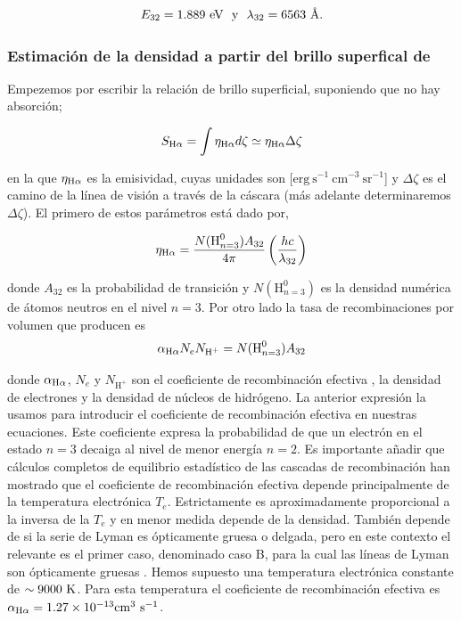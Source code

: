 \begin{equation}
 \label{eq:values-energy-landa}
  E_{32} = 1.889~\text{eV}  ~~ \text{y} ~~
  \lambda_{32} = 6563~\text{\AA{}}{}.
 \end{equation}

\subsubsection{Estimación de la densidad a partir del brillo superfical de \ha{} }
\label{sec:brillo}

Empezemos por escribir la relación de brillo superficial, suponiendo que no hay absorción;

\begin{equation}
  \label{eq:brillo}
  S_{\mathrm{H}\alpha{}} = \int \eta_{\mathrm{H}\alpha{}} d\zeta \simeq \eta_{\mathrm{H}\alpha{}} \Delta \zeta
\end{equation}  

\noindent en la que  \(\eta_{\mathrm{H}\alpha{}}\) es la emisividad, cuyas unidades son [\(\mathrm{erg~s^{-1}~cm^{-3}~sr^{-1}}\)] y \(\Delta \zeta\) es el camino de la línea de visión a través de la cáscara (más adelante determinaremos \(\Delta \zeta\)). El primero de estos parámetros está dado por,

  \begin{equation}
    \label{eq:emision-coeficiente}
    \eta_{\mathrm{H}\alpha} = \frac{N(\text{H}^0_{n=3})A_{32}}{4 \pi} \left(\frac{hc}{\lambda_{32}}\right) 
  \end{equation}

donde \(A_{32}\) es la probabilidad de transición y \(N(\text{H}^0_{n=3})\) es la densidad numérica de átomos neutros en el nivel \(n=3\). Por otro lado la tasa de recombinaciones por volumen que producen \ha{} es 
\begin{equation}
  \label{eq:recombinaciones}
  \alpha_{\mathrm{H}\alpha} N_{e}N_{\text{H}^{+}}=N(\text{H}^0_{n=3})A_{32}
\end{equation}

donde  \(\alpha_{\mathrm{H}\alpha}\), \(N_{e}\) y \(N_{\text{H}^{+}}\)  son el coeficiente de recombinación efectiva \citep{Osterbrock:2006}, la densidad de electrones y la densidad de núcleos de hidrógeno. La anterior expresión la usamos para introducir el coeficiente de recombinación efectiva en nuestras ecuaciones. Este coeficiente expresa la probabilidad de que un electrón en el estado \(n=3\) decaiga al nivel de menor energía \(n=2\). Es importante añadir que cálculos completos de equilibrio estadístico de las cascadas de recombinación han mostrado que el coeficiente de recombinación efectiva depende principalmente de la temperatura electrónica \(T_{e}\). Estrictamente es aproximadamente proporcional a la inversa de la  \(T_{e}\) \citep{Pequignot:1991, Nussbaumer:1984} y en menor medida depende de la densidad. También depende de si la serie de Lyman es ópticamente gruesa o delgada, pero en este contexto el relevante es el primer caso, denominado caso B, para la cual las líneas de Lyman son ópticamente gruesas \citep{Hummer:1987}. Hemos supuesto una temperatura electrónica constante de \(\sim 9000~\mathrm{K} \). Para esta temperatura el coeficiente de recombinación efectiva es \(\alpha_{\mathrm{H}\alpha}=1.27\times 10^{-13}\mathrm{cm}^{3}~\text{s}^{-1} \).\\

